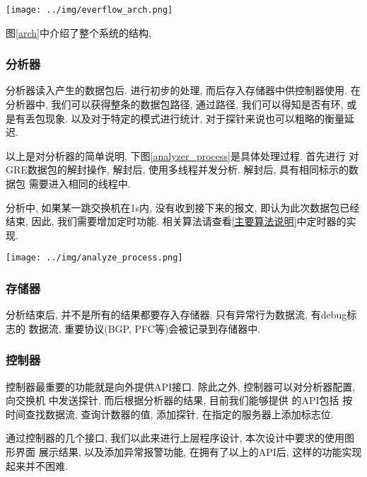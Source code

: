 {\begin{mdframed}[everyline=true]
\begin{center}
    \texttt{[image: ../img/everflow\_arch.png]}
    \label{arch}
\end{center}

图\ref{arch}中介绍了整个系统的结构,

\subsubsection{分析器}

  分析器读入产生的数据包后. 进行初步的处理, 而后存入存储器中供控制器使用.
在分析器中, 我们可以获得整条的数据包路径, 通过路径, 我们可以得知是否有环,
或是有丢包现象. 以及对于特定的模式进行统计, 对于探针来说也可以粗略的衡量延迟.

  以上是对分析器的简单说明, 下图\ref{analyzer_process}是具体处理过程. 首先进行
对GRE数据包的解封操作, 解封后, 使用多线程并发分析. 解封后, 具有相同标示的数据包
需要进入相同的线程中.

   分析中, 如果某一跳交换机在1s内, 没有收到接下来的报文, 即认为此次数据包已经结束,
因此, 我们需要增加定时功能. 相关算法请查看\ref{主要算法说明}中定时器的实现.

\begin{center}
    \texttt{[image: ../img/analyze\_process.png]}
    \label{analyzer_process}
\end{center}

\subsubsection{存储器}

分析结束后, 并不是所有的结果都要存入存储器, 只有异常行为数据流,
有debug标志的 数据流, 重要协议(BGP, PFC等)会被记录到存储器中.

\subsubsection{控制器}

控制器最重要的功能就是向外提供API接口. 除此之外, 控制器可以对分析器配置,
向交换机 中发送探针, 而后根据分析器的结果, 目前我们能够提供 的API包括
按时间查找数据流, 查询计数器的值, 添加探针, 在指定的服务器上添加标志位.

通过控制器的几个接口, 我们以此来进行上层程序设计,
本次设计中要求的使用图形界面 展示结果, 以及添加异常报警功能,
在拥有了以上的API后, 这样的功能实现起来并不困难.


\end{mdframed}}
